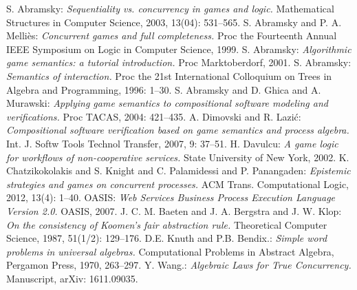 \documentclass{fac}
\begin{document}
\begin{thebibliography}{Lam94}
   S. Abramsky: \emph{Sequentiality vs. concurrency in games and logic.} Mathematical Structures in Computer Science, 2003, 13(04): 531--565.
   S. Abramsky and P. A. Melli\`{e}s: \emph{Concurrent games and full completeness.} Proc the Fourteenth Annual IEEE Symposium on Logic in Computer Science, 1999.
   S. Abramsky: \emph{Algorithmic game semantics: a tutorial introduction.} Proc Marktoberdorf, 2001.
   S. Abramsky: \emph{Semantics of interaction.} Proc the 21st International Colloquium on Trees in Algebra and Programming, 1996: 1--30.
   S. Abramsky and D. Ghica and A. Murawski: \emph{Applying game semantics to compositional software modeling and verifications.} Proc TACAS, 2004: 421--435.
   A. Dimovski and R. Lazi\'{c}: \emph{Compositional software verification based on game semantics and process algebra.} Int. J. Softw Tools Technol Transfer, 2007, 9: 37--51.
   H. Davulcu: \emph{A game logic for workflows of non-cooperative services.} State University of New York, 2002.
   K. Chatzikokolakis and S. Knight and C. Palamidessi and P. Panangaden: \emph{Epistemic strategies and games on concurrent processes.} ACM Trans. Computational Logic, 2012, 13(4): 1--40.
   OASIS: \emph{Web Services Business Process Execution Language Version 2.0.} OASIS, 2007.
   J. C. M. Baeten and J. A. Bergstra and J. W. Klop: \emph{On the consistency of Koomen's fair abstraction rule.} Theoretical Computer Science, 1987, 51(1/2): 129--176.
   D.E. Knuth and P.B. Bendix.: \emph{Simple word problems in universal algebras.} Computational Problems in Abstract Algebra, Pergamon Press, 1970, 263--297.
   Y. Wang.: \emph{Algebraic Laws for True Concurrency.} Manuscript, arXiv: 1611.09035.
\end{thebibliography}



\label{lastpage}
\end{document}

